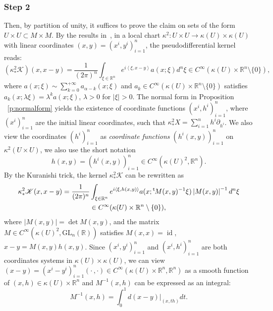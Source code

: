 \documentclass[JEP,XML,SOM,Unicode]{cedram}
\let\pazocal\mathscr
\theoremstyle{definition}
\newcommand{\GL}{\mathrm{GL}}
\let\cv\alpha
\let\asigma a
\let\euler X
\DeclareMathOperator\id{id}
\newcommand{\module}[1]{\left|#1\right|}
\newcommand{\step}[1]{\subsubsection*{Step #1}}
\renewcommand{\t}{{{}^{\mathrm{t}\mkern-2mu}}}
\begin{document}
\step{2} Then, by partition of unity, it suffices to prove the claim on sets
of the form $U\times U\subset M\times M$. By the results in~\cite{Lesch}, in a local chart $\kappa^2:U\times U\to \kappa(U)\times \kappa(U) $ with linear coordinates $(x,y)=(x^i,y^i)_{i=1}^n$, the pseudodifferential kernel reads:
\[
{\left(\kappa^2_*\pazocal{K}\right)}(x,x-y)=\frac{1}{(2\pi)^n}\int_{\xi\in \mathbb{R}^n} e^{i\left\langle \xi,x-y\right\rangle} \asigma(x;\xi) d^n\xi \in C^\infty(\kappa(U)\times \mathbb{R}^n\setminus\{0\}),
\]
where $\asigma(x;\xi)\sim \sum_{k=0}^{+\infty} \asigma_{\cv-k}(x;\xi)$ and
$\asigma_k\in C^\infty(\kappa(U) \times \mathbb{R}^n\setminus\{0\}) $
satisfies $\asigma_k(x;\lambda\xi)=\lambda^k\asigma(x;\xi)$, $\lambda>0$ for $\vert \xi\vert>0$.
{The normal form in Proposition ~\ref{p:normalform} yields the existence
of}
coordinate functions $(x^i,h^i)_{i=1}^n$, where $(x^i)_{i=1}^n$ are the initial linear coordinates, such that
$\kappa^2_*\euler=\sum_{i=1}^n h^i\partial_{h^i}$. We also view the coordinates $(h^i)_{i=1}^n$ as \emph{coordinate functions} $\left(h^i(x,y)\right)_{i=1}^n$
on $\kappa^2(U \times U)$, we also use the short notation
\[
h(x,y)=(h^i(x,y))_{i=1}^n\in C^\infty(\kappa(U)^2,\mathbb{R}^n).
\]
By the Kuranishi trick, the kernel
$\kappa^2_*\pazocal{K}$ can be rewritten as
\begin{multline*}
\kappa^2_*\pazocal{K}(x,x-y)=\frac{1}{(2\pi)^n}\int_{\xi\in \mathbb{R}^n} e^{i\left\langle \xi,h(x,y)\right\rangle} \asigma(x; \t M(x,y)^{-1} \xi) \module{M(x,y)}^{-1}d^n\xi \\ \in C^\infty(\kappa(U)\times \mathbb{R}^n\setminus\{0\}),
\end{multline*}
where $\module{M(x,y)}=\det{M(x,y)}$, and the matrix $M\in C^\infty(\kappa(U)^2,\GL_n(\mathbb{R}))$ satisfies $M(x,x)=\id$, $x-y=M(x,y)h(x,y)$. Since $(x^i,y^i)_{i=1}^n$ and $(x^i,h^i)_{i=1}^n$ are both coordinates systems in $\kappa(U)\times \kappa(U)$, we can view $(x-y)=(x^i-y^i)_{i=1}^n(\cdot\,,\cdot)\in C^\infty(\kappa(U)\times \mathbb{R}^n,\mathbb{R}^n)$
as a smooth function of $(x,h)\in \kappa(U)\times \mathbb{R}^n$
and $M^{-1}(x,h)$ can be expressed
as an integral:
\[
M^{-1}(x,h)=\int_0^1 d(x-y)|_{(x,th)} dt.
\]
\end{document}
